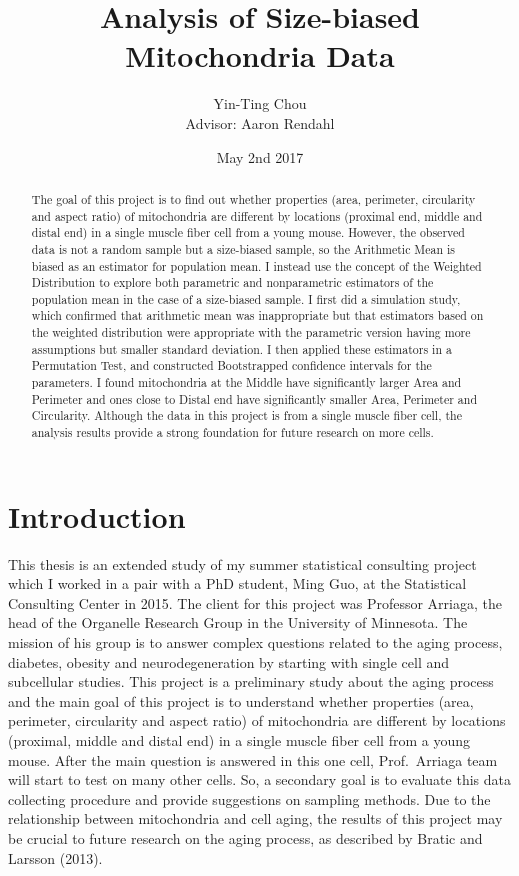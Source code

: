 \documentclass{article}\usepackage[]{graphicx}\usepackage[]{color}
\title{\vspace{-5ex} Analysis of Size-biased Mitochondria Data \vspace{-2ex}}
\author{Yin-Ting Chou \\
  Advisor: Aaron Rendahl \vspace{-2ex}}
\date{May 2nd 2017}
\numberwithin{figure}{subsection} %
\numberwithin{table}{subsection} %
\begin{document}
\maketitle

\begin{abstract}
The goal of this project is to find out whether properties (area, perimeter, circularity and aspect ratio) of mitochondria are different by locations (proximal end, middle and distal end) in a single muscle fiber cell from a young mouse. However, the observed data is not a random sample but a size-biased sample, so the Arithmetic Mean is biased as an estimator for population mean. I instead use the concept of the Weighted Distribution to explore both parametric and nonparametric estimators of the population mean in the case of a size-biased sample. I first did a simulation study, which confirmed that arithmetic mean was inappropriate but that estimators based on the weighted distribution were appropriate with the parametric version having more assumptions but smaller standard deviation. I then applied these estimators in a Permutation Test, and constructed Bootstrapped confidence intervals for the parameters. I found mitochondria at the Middle have significantly larger Area and Perimeter and ones close to Distal end have significantly smaller Area, Perimeter and Circularity. Although the data in this project is from a single muscle fiber cell, the analysis results provide a strong foundation for future research on more cells.  
\end{abstract}

\newpage

\section{Introduction} 
This thesis is an extended study of my summer statistical consulting project which I worked in a pair with a PhD student, Ming Guo, at the Statistical Consulting Center in 2015. The client for this project was Professor Arriaga, the head of the Organelle Research Group in the University of Minnesota. The mission of his group is to answer complex questions related to the aging process, diabetes, obesity and neurodegeneration by starting with single cell and subcellular studies. This project is a preliminary study about the aging process and the main goal of this project is to understand whether properties (area, perimeter, circularity and aspect ratio) of mitochondria are different by locations (proximal, middle and distal end) in a single muscle fiber cell from a young mouse. After the main question is answered in this one cell, Prof.\ Arriaga team will start to test on many other cells. So, a secondary goal is to evaluate this data collecting procedure and provide suggestions on sampling methods. Due to the relationship between mitochondria and cell aging, the results of this project may be crucial to future research on the aging process, as described by Bratic and Larsson (2013).
 
\end{document}

